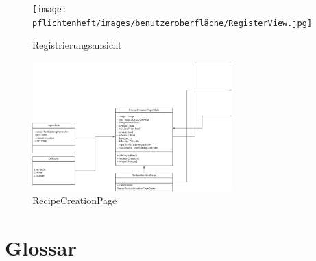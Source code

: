 \documentclass[parskip=full]{scrartcl}
\begin{document}
        \begin{figure}[htp]
            \begin{minipage}
                [t]{0.49\textwidth}
                \centering
                \texttt{[image: pflichtenheft/images/benutzeroberfläche/RegisterView.jpg]}
                \caption{Registrierungsansicht}
            \end{minipage}
            \begin{minipage}
                [t]{0.49\textwidth}
                \centering
                \includegraphics[height = 50mm]{entwurfsheft/images/Presentation-layer/Recipe Creation Page.png}
                \caption{RecipeCreationPage}
            \end{minipage}
        \end{figure}

 
\newpage
\section{Glossar}
\printglossary[style=altlist]
\end{document}
